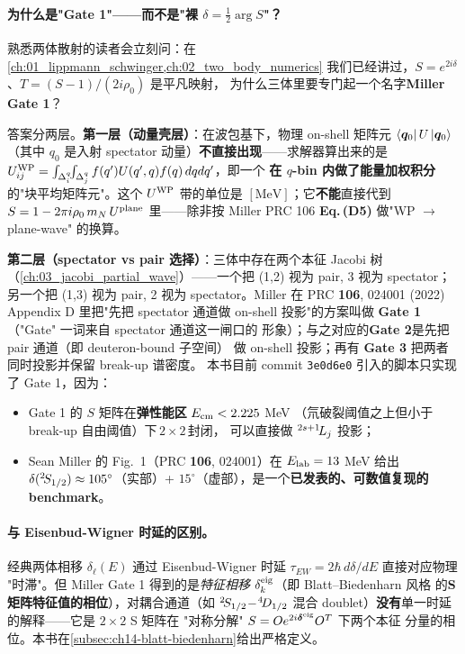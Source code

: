 \paragraph{为什么是"Gate 1"——而不是"裸 \(\delta = \tfrac{1}{2}\arg S\)"？}
熟悉两体散射的读者会立刻问：在 \cref{ch:01_lippmann_schwinger,ch:02_two_body_numerics}
我们已经讲过，\(S = e^{2i\delta}\)、\(T = (S - 1)/(2i\rho_0)\) 是平凡映射，
为什么三体里要专门起一个名字\textbf{Miller Gate 1}？

答案分两层。\textbf{第一层（动量壳层）}：在波包基下，物理 on-shell
矩阵元 \(\bra{\bm{q}_0} U \ket{\bm{q}_0}\)（其中 \(q_0\) 是入射 spectator
动量）\textbf{不直接出现}——求解器算出来的是
\(U^{\rm WP}_{ij} = \int_{\Delta_{i}^{q}}\!\!\int_{\Delta_{j}^{q}}
f(q')U(q', q) f(q)\,dq dq'\)，即一个
\textbf{在 \(q\)-bin 内做了能量加权积分}的"块平均矩阵元"。这个 \(U^{\rm WP}\)
带的单位是 \([\text{MeV}]\)；它\textbf{不能}直接代到
\(S = 1 - 2\pi i \rho_0\, m_N\, U^{\rm plane}\) 里——除非按 Miller PRC 106
\textbf{Eq.\,(D5)} 做"WP \(\to\) plane-wave" 的换算。

\textbf{第二层（spectator vs pair 选择）}：三体中存在两个本征 Jacobi 树
（\cref{ch:03_jacobi_partial_wave}）——一个把 (1,2) 视为 pair, 3 视为
spectator；另一个把 (1,3) 视为 pair, 2 视为 spectator。Miller 在
PRC \textbf{106}, 024001 (2022) Appendix D 里把"先把 spectator 通道做 on-shell
投影"的方案叫做 \textbf{Gate 1}（"Gate" 一词来自 spectator 通道这一闸口的
形象）；与之对应的\textbf{Gate 2}是先把 pair 通道（即 deuteron-bound 子空间）
做 on-shell 投影；再有 \textbf{Gate 3} 把两者同时投影并保留 break-up 谱密度。
本书目前 commit \texttt{3e0d6e0} 引入的脚本只实现了 Gate 1，因为：
\begin{itemize}
  \item Gate 1 的 \(S\) 矩阵在\textbf{弹性能区} \(E_{\rm cm} < 2.225\) MeV
        （氘破裂阈值之上但小于 break-up 自由阈值）下\(\,2\!\times\!2\,\)封闭，
        可以直接做 \({}^{2s+1}\!L_{j}\) 投影；
  \item Sean Miller 的 Fig.~1（PRC \textbf{106}, 024001）在 \(E_{\rm lab} = 13\)
        MeV 给出 \(\delta({}^{2}\!S_{1/2}) \approx 105^\circ\)（实部）+
        \(15^\circ\)（虚部），是一个\textbf{已发表的、可数值复现的 benchmark}。
\end{itemize}

\paragraph{与 Eisenbud-Wigner 时延的区别。}
经典两体相移 \(\delta_{\ell}(E)\) 通过 Eisenbud-Wigner 时延
\(\tau_{EW} = 2\hbar\, d\delta/dE\) 直接对应物理 "时滞"。但 Miller Gate 1
得到的是\emph{特征相移} \(\delta^{\rm eig}_k\)（即 Blatt--Biedenharn 风格
的\textbf{S 矩阵特征值的相位}），对耦合通道（如 \({}^{2}\!S_{1/2}\!-\!{}^{4}\!D_{1/2}\)
混合 doublet）\textbf{没有}单一时延的解释——它是 \(2\!\times\!2\) S 矩阵在
"对称分解" \(S = O e^{2i\boldsymbol{\delta}^{\rm eig}} O^T\) 下两个本征
分量的相位。本书在\cref{subsec:ch14-blatt-biedenharn}给出严格定义。

